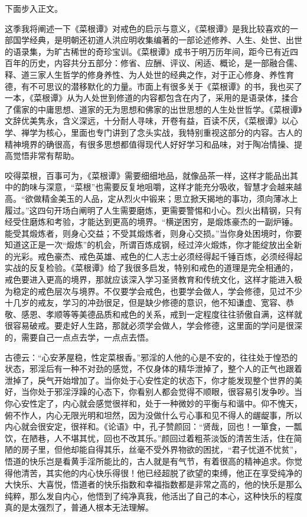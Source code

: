 下面步入正文。

这季我将阐述一下《菜根谭》对戒色的启示与意义，《菜根谭》是我比较喜欢的一部国学经典，是明朝还初道人洪应明收集编著的一部论述修养、人生、处世、出世的语录集，为旷古稀世的奇珍宝训。《菜根谭》成书于明万历年间，距今已有近四百年的历史，内容共分五部分：修省、应酬、评议、闲适、概论，是一部融合儒、释、道三家人生哲学的修身养性、为人处世的经典之作，对于正心修身、养性育德，有不可思议的潜移默化的力量。市面上有很多关于《菜根谭》的书，我也买了一本，《菜根谭》从为人处世到修道的内容都包含在内了，采用的是语录体，揉合了儒家的中庸思想、道家的无为思想和佛家的出世思想的人生处世哲学。《菜根谭》文辞优美隽永，含义深远，十分耐人寻味，开卷有益，百读不厌，《菜根谭》以心学、禅学为核心，里面也专门讲到了念头实战，我特别重视这部分的内容。古人的精神境界的确很高，有很多思想都值得现代人好好学习和品味，对于陶冶情操、提高觉悟非常有帮助。

咬得菜根，百事可为，《菜根谭》需要细细地品，就像品茶一样，这样才能品出其中的韵味与深意，“菜根”也需要反复地咀嚼，这样才能充分吸收，智慧才会越来越高。“欲做精金美玉的人品，定从烈火中锻来；思立掀天揭地的事功，须向薄冰上履过。”这四句开场白阐明了人生需要磨炼，更需要警惕和小心。烈火出精钢，只有经受住磨炼和考验，才能达到更高的境界。“横逆困穷，是煅炼豪杰的一副炉锤。能受其煅炼者，则身心交益；不受其煅炼者，则身心交损。”当你身处困境时，你要知道这正是一次“煅炼”的机会，所谓百炼成钢，经过淬火煅炼，你才能绽放出全新的光彩。戒色豪杰、戒色英雄、戒色的仁人志士必须经得起千锤百炼，必须经得起实战的反复检验。《菜根谭》给了我很多启发，特别和戒色的道理是完全相通的，戒色要进入更高的境界，那就应该深入学习圣贤教育和传统文化，这样才能进入极为稳定的戒色层次与境界。不仅要学会戒色，也要学会做人，学会修德，见过不少十几岁的戒友，学习的冲劲很足，但是缺少修德的意识，他不知谦虚、宽容、恭敬、感恩、孝顺等等美德品质和戒色的关系，戒到一定程度往往骄傲自满，这样就很容易破戒。要走好人生路，那就必须学会做人，学会修德，这里面的学问是很深的，需要自己一点点去学，一点点去悟。

古德云：“心安茅屋稳，性定菜根香。”邪淫的人他的心是不安的，往往处于惶恐的状态，邪淫后有一种不对劲的感觉，不仅身体的精华泄掉了，整个人的正气也跟着泄掉了，戾气开始增加了。当你处于心安性定的状态下，你才能发现整个世界的美好，当你处于邪淫浮躁的心态下，你看别人都会觉得不顺眼，很容易引发争吵。当你心安性定了，内心就会感觉很祥和，处于一种微妙的平衡与和谐中。仰不愧天，俯不怍人，内心无限光明和坦然，因为没做什么亏心事和见不得人的龌龊事，所以内心就会很安定，很祥和。《论语》中，孔子赞颜回：“贤哉，回也！一箪食，一瓢饮，在陋巷，人不堪其忧，回也不改其乐。”颜回过着粗茶淡饭的清苦生活，住在简陋的房子里，但他却能自得其乐，丝毫不受外界物欲的困扰，“君子忧道不忧贫”，悟道的快乐岂是看黄手淫所能比的，古人就是有气节，有着很高的精神追求。你觉得他清苦，其实他的内心快乐得很！他已经超脱了欲望的束缚，他正在享受纯净的大快乐、大喜悦，悟道者的快乐指数和幸福指数都是非常之高的，他的快乐是那么纯粹，那么发自内心，他悟到了纯净真我，他活出了自己的本心，这种快乐的程度真的是太强烈了，普通人根本无法理解。

